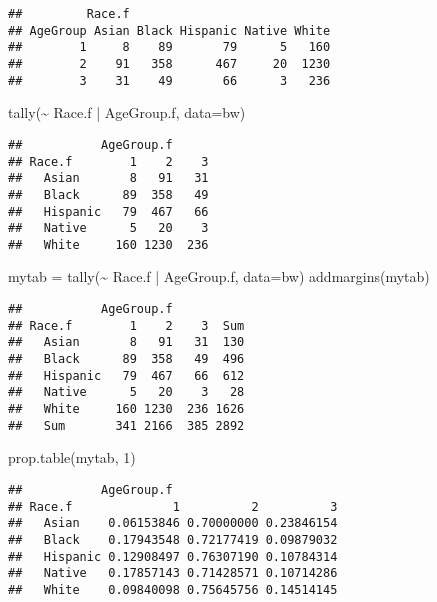 \documentclass[
]{article}
\newenvironment{Shaded}{\begin{snugshade}}{\end{snugshade}}
\newcommand{\AttributeTok}[1]{\textcolor[rgb]{0.77,0.63,0.00}{#1}}
\newcommand{\DecValTok}[1]{\textcolor[rgb]{0.00,0.00,0.81}{#1}}
\newcommand{\FunctionTok}[1]{\textcolor[rgb]{0.00,0.00,0.00}{#1}}
\newcommand{\NormalTok}[1]{#1}
\newcommand{\OtherTok}[1]{\textcolor[rgb]{0.56,0.35,0.01}{#1}}
\newcommand{\SpecialCharTok}[1]{\textcolor[rgb]{0.00,0.00,0.00}{#1}}
\begin{document}
\begin{verbatim}
##         Race.f
## AgeGroup Asian Black Hispanic Native White
##        1     8    89       79      5   160
##        2    91   358      467     20  1230
##        3    31    49       66      3   236
\end{verbatim}

\begin{Shaded}
\begin{Highlighting}[]
\FunctionTok{tally}\NormalTok{(}\SpecialCharTok{\textasciitilde{}}\NormalTok{ Race.f }\SpecialCharTok{|}\NormalTok{ AgeGroup.f, }\AttributeTok{data=}\NormalTok{bw)}
\end{Highlighting}
\end{Shaded}

\begin{verbatim}
##           AgeGroup.f
## Race.f        1    2    3
##   Asian       8   91   31
##   Black      89  358   49
##   Hispanic   79  467   66
##   Native      5   20    3
##   White     160 1230  236
\end{verbatim}

\begin{Shaded}
\begin{Highlighting}[]
\NormalTok{mytab }\OtherTok{=} \FunctionTok{tally}\NormalTok{(}\SpecialCharTok{\textasciitilde{}}\NormalTok{ Race.f }\SpecialCharTok{|}\NormalTok{ AgeGroup.f, }\AttributeTok{data=}\NormalTok{bw)}
\FunctionTok{addmargins}\NormalTok{(mytab)}
\end{Highlighting}
\end{Shaded}

\begin{verbatim}
##           AgeGroup.f
## Race.f        1    2    3  Sum
##   Asian       8   91   31  130
##   Black      89  358   49  496
##   Hispanic   79  467   66  612
##   Native      5   20    3   28
##   White     160 1230  236 1626
##   Sum       341 2166  385 2892
\end{verbatim}

\begin{Shaded}
\begin{Highlighting}[]
\FunctionTok{prop.table}\NormalTok{(mytab, }\DecValTok{1}\NormalTok{)}
\end{Highlighting}
\end{Shaded}

\begin{verbatim}
##           AgeGroup.f
## Race.f              1          2          3
##   Asian    0.06153846 0.70000000 0.23846154
##   Black    0.17943548 0.72177419 0.09879032
##   Hispanic 0.12908497 0.76307190 0.10784314
##   Native   0.17857143 0.71428571 0.10714286
##   White    0.09840098 0.75645756 0.14514145
\end{verbatim}
\end{document}
